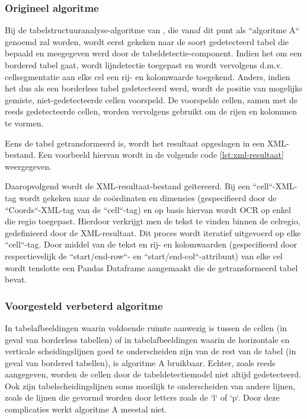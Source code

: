 \subsubsection{Origineel algoritme}
\label{subsubsec:origineel-algoritme}

Bij de tabelstructuuranalyse-algoritme van \textcite{Prasad2020}, die vanaf dit punt als ``algoritme A`` genoemd zal worden, wordt eerst gekeken naar de soort gedetecteerd tabel die bepaald en meegegeven werd door de tabeldetectie-component. Indien het om een bordered tabel gaat, wordt lijndetectie toegepast en wordt vervolgens d.m.v. cellsegmentatie aan elke cel een rij- en kolomwaarde toegekend. Anders, indien het dus als een borderless tabel gedetecteerd werd, wordt de positie van mogelijks gemiste, niet-gedetecteerde cellen voorspeld. De voorspelde cellen, samen met de reeds gedetecteerde cellen, worden vervolgens gebruikt om de rijen en kolommen te vormen.

Eens de tabel getransformeerd is, wordt het resultaat opgeslagen in een XML-bestand. Een voorbeeld hiervan wordt in de volgende code \ref{lst:xml-resultaat} weergegeven.\newpage



Daaropvolgend wordt de XML-resultaat-bestand geïtereerd. Bij een ``cell``-XML-tag wordt gekeken naar de coördinaten en dimensies (gespecifieerd door de ``Coords``-XML-tag van de ``cell``-tag) en op basis hiervan wordt \Gls{OCR} op enkel die regio toegepast. Hierdoor verkrijgt men de tekst te vinden binnen de celregio, gedefinieerd door de XML-resultaat. Dit proces wordt iteratief uitgevoerd op elke ``cell``-tag. Door middel van de tekst en rij- en kolomwaarden (gespecifieerd door respectievelijk de ``start/end-row``- en ``start/end-col``-attribuut) van elke cel wordt tenslotte een Pandas Dataframe aangemaakt die de getransformeerd tabel bevat.

\subsubsection{Voorgesteld verbeterd algoritme}
\label{subsubsec:origineel-algoritme}

In tabelafbeeldingen waarin voldoende ruimte aanwezig is tussen de cellen (in geval van borderless tabellen) of in tabelafbeeldingen waarin de horizontale en verticale scheidingslijnen goed te onderscheiden zijn van de rest van de tabel (in geval van bordered tabellen), is algoritme A bruikbaar. Echter, zoals reeds aangegeven, worden de cellen door de tabeldetectiemodel niet altijd gedetecteerd. Ook zijn tabelscheidingslijnen soms moeilijk te onderscheiden van andere lijnen, zoals de lijnen die gevormd worden door letters zoals de `l` of `p`. Door deze complicaties werkt algoritme A meestal niet.


